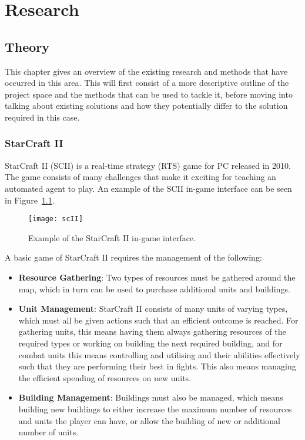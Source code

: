 \chapter{Research}%
\label{research}

\section{Theory}

This chapter gives an overview of the existing research and methods that
have occurred in this area. This will first consist of a more descriptive
outline of the project space and the methods that can be used to tackle it,
before moving into talking about existing solutions and how they potentially
differ to the solution required in this case.

\subsection{StarCraft II}

StarCraft II (SCII) is a real-time strategy (RTS) game for PC released in 2010.
The game consists of many challenges that make it exciting for
teaching an automated agent to play. An example of the SCII in-game
interface can be seen in Figure~\ref{fig:scII}.

\begin{figure}
    \centering
    \texttt{[image: scII]}
    \caption{Example of the StarCraft II in-game interface.}%
    \label{fig:scII}
\end{figure}

A basic game of StarCraft II requires the management of the following:

\begin{itemize}
    \item \textbf{Resource Gathering}: Two types of resources must be gathered
        around the map, which in turn can be used to purchase additional units
        and buildings.
    \item \textbf{Unit Management}: StarCraft II consists of many
        units of varying types, which must all be given actions such that an
        efficient outcome is reached. For gathering units, this means having
        them always gathering resources of the required types or working on
        building the next required building, and for combat units
        this means controlling and utilising and their abilities effectively
        such that they are performing their best in fights. This also means
        managing the efficient spending of resources on new units.
    \item \textbf{Building Management}: Buildings must also be managed, which
        means building new buildings to either increase the maximum number of
        resources and units the player can have, or allow the building of new or
        additional number of units.
\end{itemize}

